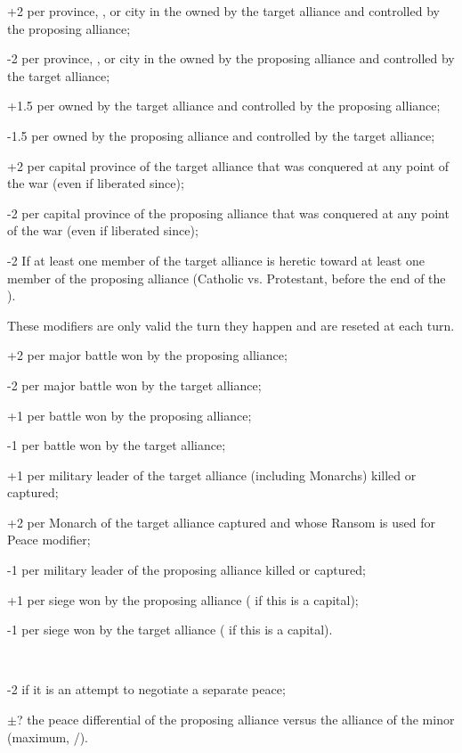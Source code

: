 \begin{modlist}
\item[+2] per province, \TP\faceplus, \COL or city in the \ROTW owned by the
  target alliance and controlled by the proposing alliance;
\item[-2] per province, \TP\faceplus, \COL or city in the \ROTW owned by the
  proposing alliance and controlled by the target alliance;
\item[+1.5] per \TP\facemoins owned by the target alliance and controlled by
  the proposing alliance;
\item[-1.5] per \TP\facemoins owned by the proposing alliance and controlled
  by the target alliance;
\item[+2] per capital province of the target alliance that was conquered at
  any point of the war (even if liberated since);
\item[-2] per capital province of the proposing alliance that was conquered at
  any point of the war (even if liberated since);
\item[-2] If at least one member of the target alliance is heretic toward at
  least one member of the proposing alliance (Catholic vs. Protestant, before
  the end of the ).
\end{modlist}
 These modifiers are only valid the turn
they happen and are reseted at each turn.
\begin{modlist}
\item[+2] per major battle won by the proposing alliance;
\item[-2] per major battle won by the target alliance;  
\item[+1] per battle won by the proposing alliance;
\item[-1] per battle won by the target alliance;
\item[+1] per military leader of the target alliance (including Monarchs)
  killed or captured;
\item[+2] per Monarch of the target alliance captured and whose Ransom is used
  for Peace modifier;
\item[-1] per military leader of the proposing alliance killed or captured;
\item[+1] per siege won by the proposing alliance ( if this is a
  capital);
\item[-1] per siege won by the target alliance ( if this is a
  capital).
\end{modlist}
~
\begin{modlist}
\item[-2] if it is an attempt to negotiate a separate peace;
\item[$\pm$?] the peace differential of the proposing alliance versus the
  alliance of the minor (maximum, /). 
\end{modlist}

